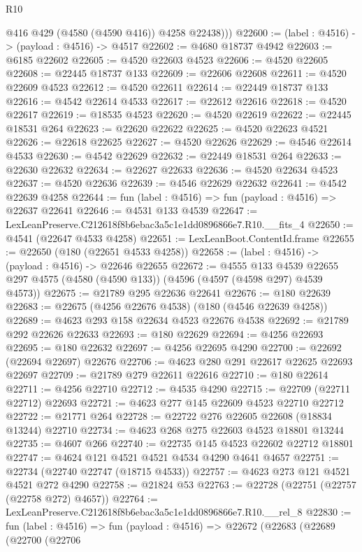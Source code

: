 \begin{lexlean}{R10}
\begin{coremodule}
          @416
          @429
          (@4580 (@4590 @416))
          @4258
          @22438)))
@22600 := (label : @4516) -> (payload : @4516) -> @4517
@22602 := @4680 @18737 @4942
@22603 := @6185 @22602
@22605 := @4520 @22603 @4523
@22606 := @4520 @22605
@22608 := @22445 @18737 @133
@22609 := @22606 @22608
@22611 := @4520 @22609 @4523
@22612 := @4520 @22611
@22614 := @22449 @18737 @133
@22616 := @4542 @22614 @4533
@22617 := @22612 @22616
@22618 := @4520 @22617
@22619 := @18535 @4523
@22620 := @4520 @22619
@22622 := @22445 @18531 @264
@22623 := @22620 @22622
@22625 := @4520 @22623 @4521
@22626 := @22618 @22625
@22627 := @4520 @22626
@22629 := @4546 @22614 @4533
@22630 := @4542 @22629
@22632 := @22449 @18531 @264
@22633 := @22630 @22632
@22634 := @22627 @22633
@22636 := @4520 @22634 @4523
@22637 := @4520 @22636
@22639 := @4546 @22629 @22632
@22641 := @4542 @22639 @4258
@22644 := fun (label : @4516) => fun (payload : @4516) => @22637 @22641
@22646 := @4531 @133 @4539
@22647 := LexLeanPreserve.C212618f8b6ebac3a5c1e1dd0896866e7.R10.__fits_4
@22650 := @4541 (@22647 @4533 @4258)
@22651 := LexLeanBoot.ContentId.frame
@22655 := @22650 (@180 (@22651 @4533 @4258))
@22658 := (label : @4516) -> (payload : @4516) -> @22646 @22655
@22672 := @4555
    @133
    @4539
    @22655
    @297
    @4575
    (@4580 (@4590 @133))
    (@4596 (@4597 (@4598 @297) @4539 @4573))
@22675 := @21789 @295 @22636 @22641
@22676 := @180 @22639
@22683 := @22675 (@4256 @22676 @4538) (@180 (@4546 @22639 @4258))
@22689 := @4623 @293 @158 @22634 @4523 @22676 @4538
@22692 := @21789 @292 @22626 @22633
@22693 := @180 @22629
@22694 := @4256 @22693
@22695 := @180 @22632
@22697 := @4256 @22695 @4290
@22700 := @22692 (@22694 @22697) @22676
@22706 := @4623 @280 @291 @22617 @22625 @22693 @22697
@22709 := @21789 @279 @22611 @22616
@22710 := @180 @22614
@22711 := @4256 @22710
@22712 := @4535 @4290
@22715 := @22709 (@22711 @22712) @22693
@22721 := @4623 @277 @145 @22609 @4523 @22710 @22712
@22722 := @21771 @264
@22728 := @22722 @276 @22605 @22608 (@18834 @13244) @22710
@22734 := @4623 @268 @275 @22603 @4523 @18801 @13244
@22735 := @4607 @266
@22740 := @22735 @145 @4523 @22602 @22712 @18801
@22747 := @4624 @121 @4521 @4521 @4534 @4290 @4641 @4657
@22751 := @22734 (@22740 @22747 (@18715 @4533))
@22757 := @4623 @273 @121 @4521 @4521 @272 @4290
@22758 := @21824 @53
@22763 := @22728 (@22751 (@22757 (@22758 @272) @4657))
@22764 := LexLeanPreserve.C212618f8b6ebac3a5c1e1dd0896866e7.R10.__rel_8
@22830 := fun (label : @4516) =>
  fun (payload : @4516) =>
  @22672
    (@22683
      (@22689
        (@22700
          (@22706

\end{coremodule}
\end{lexlean}
